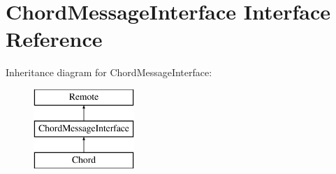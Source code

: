\hypertarget{interface_chord_message_interface}{}\section{Chord\+Message\+Interface Interface Reference}
\label{interface_chord_message_interface}
Inheritance diagram for Chord\+Message\+Interface\+:\begin{figure}[H]
\begin{center}
\leavevmode
\includegraphics[height=3.000000cm]{interface_chord_message_interface}
\end{center}
\end{figure}
